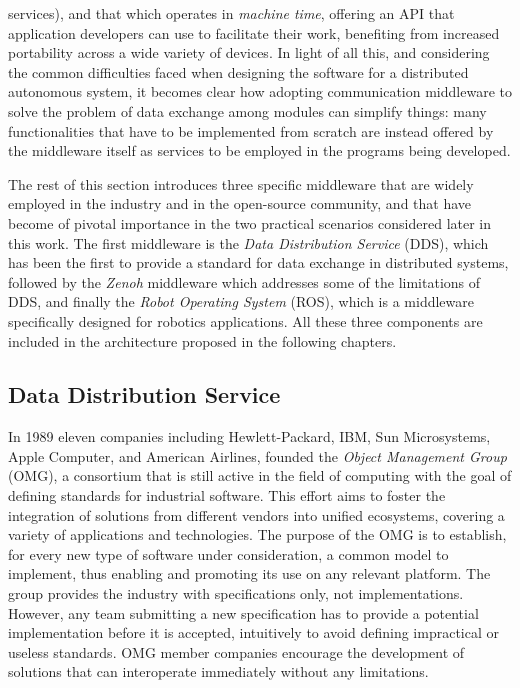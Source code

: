 services), and that which operates in \emph{machine time}, offering an API that application developers can use to facilitate their work, benefiting from increased portability across a wide variety of devices. In light of all this, and considering the common difficulties faced when designing the software for a distributed autonomous system, it becomes clear how adopting communication middleware to solve the problem of data exchange among modules can simplify things: many functionalities that have to be implemented from scratch are instead offered by the middleware itself as services to be employed in the programs being developed.

The rest of this section introduces three specific middleware that are widely employed in the industry and in the open-source community, and that have become of pivotal importance in the two practical scenarios considered later in this work. The first middleware is the \emph{Data Distribution Service} (DDS), which has been the first to provide a standard for data exchange in distributed systems, followed by the \emph{Zenoh} middleware which addresses some of the limitations of DDS, and finally the \emph{Robot Operating System} (ROS), which is a middleware specifically designed for robotics applications. All these three components are included in the architecture proposed in the following chapters.

\subsection{Data Distribution Service}
\label{sec:dds}
In 1989 eleven companies including Hewlett-Packard, IBM, Sun Microsystems, Apple Computer, and American Airlines, founded the \emph{Object Management Group} (OMG), a consortium that is still active in the field of computing with the goal of defining standards for industrial software. This effort aims to foster the integration of solutions from different vendors into unified ecosystems, covering a variety of applications and technologies. The purpose of the OMG is to establish, for every new type of software under consideration, a common model to implement, thus enabling and promoting its use on any relevant platform. The group provides the industry with specifications only, not implementations. However, any team submitting a new specification has to provide a potential implementation before it is accepted, intuitively to avoid defining impractical or useless standards. OMG member companies encourage the development of solutions that can interoperate immediately without any limitations.


